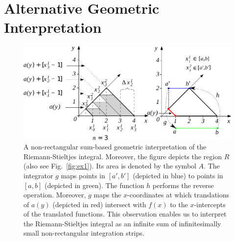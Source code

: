 \documentclass{article}
\theoremstyle{theorem}
\theoremstyle{definition}
\begin{document}
\section{Alternative Geometric Interpretation}
\begin{figure}[htb]
\centering
\includegraphics[width=1\textwidth]{fig13_change}
\caption{A non-rectangular sum-based geometric interpretation of the Riemann-Stieltjes integral. Moreover, the figure depicts the region $R$ (also see Fig.~\ref{fig:ex1}).
Its area is denoted by the symbol $A$. The integrator $g$ maps points 
in $[a',b']$ (depicted in blue) to points in $[a,b]$ (depicted in green). The function $h$ performs the reverse operation. Moreover, $g$ maps the $x$-coordinates at which
translations of $a(y)$ (depicted in red) intersect with $f(x)$ to the $x$-intercepts of the translated functions. This observation enables us to interpret the Riemann-Stieltjes integral as an infinite sum of infinitesimally small non-rectangular integration 
strips.}
\label{fig:2d_geo}
\end{figure}
\end{document}
